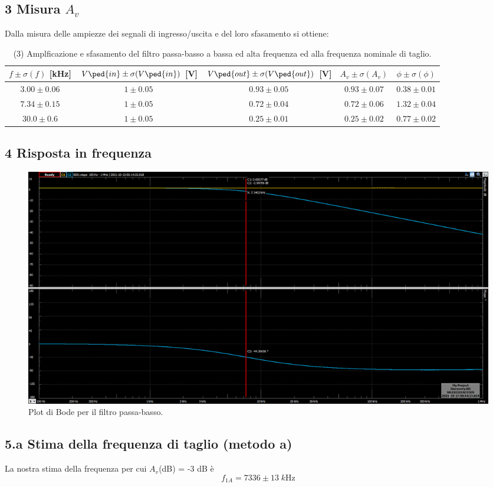 \documentclass[10pt,a4paper]{article}
\begin{document}
\subsection*{3 Misura $A_v$}
Dalla misura delle ampiezze dei segnali di ingresso/uscita e del loro 
sfasamento si ottiene:
\begin{table}[h]
\centering
\begin{tabular}{|c|c|c|c|c|}
\hline 
$f \pm \sigma(f)$ [kHz] & $V\ped{in} \pm \sigma(V\ped{in})$ [V] 
                        & $V\ped{out} \pm \sigma(V\ped{out})$ [V] & $A_v \pm \sigma(A_v)$
& $\phi \pm \sigma(\phi)$ \\
\hline 
$3.00 \pm 0.06$ & $1 \pm 0.05$ & $0.93 \pm 0.05$ & $0.93 \pm 0.07$ & $0.38 \pm 0.01$ \\
$7.34 \pm 0.15$ & $1 \pm 0.05$ & $0.72 \pm 0.04$ & $0.72 \pm 0.06$ & $1.32 \pm 0.04$ \\
$30.0 \pm 0.6$ & $1 \pm 0.05$ & $0.25 \pm 0.01$ & $0.25 \pm 0.02$ & $0.77 \pm 0.02$ \\
\hline 
\end{tabular} 
\caption{(3) Amplficazione e sfasamento del filtro passa-basso a bassa ed alta 
frequenza ed alla frequenza nominale di taglio.
\label{tab:par1}}
\end{table}

\subsection*{4 Risposta in frequenza}
\begin{figure}[htbp]
\centering
\includegraphics[scale=0.35]{rc2k10nF_new}
\caption{Plot di Bode per il filtro passa-basso.}
\end{figure}

\subsection*{5.a Stima della frequenza di taglio (metodo a)}
La nostra stima della frequenza per cui $A_v$(dB) = -3 dB \`e
\[
f_{1A} = 7336 \pm 13 \; \si{k\Hz}
\]
\end{document}
